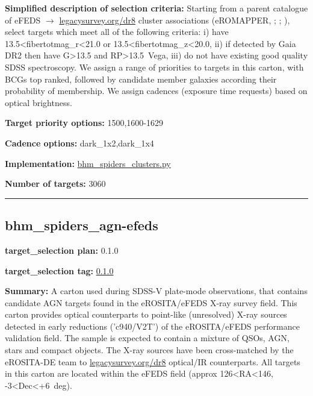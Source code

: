 \noindent\textbf{Simplified description of selection criteria:} Starting from a
parent catalogue of eFEDS $\rightarrow$
\href{https://www.legacysurvey.org/dr8}{legacysurvey.org/dr8} cluster
associations (eROMAPPER,
\citealt{Rykoff2014};
\citealt{IderChitham2020};
\citealt{Liu2022}), select targets which meet all of the following criteria:
i) have 13.5\textless fibertotmag\_r\textless21.0 or
13.5\textless fibertotmag\_z\textless20.0, ii) if detected by Gaia DR2
then have G\textgreater13.5 and RP\textgreater13.5~Vega, iii) do not
have existing good quality SDSS spectroscopy. We assign a range of
priorities to targets in this carton, with BCGs top ranked, followed by
candidate member galaxies according their probability of membership. We
assign cadences (exposure time requests) based on optical brightness.


\noindent\textbf{Target priority options:} 1500,1600-1629

\noindent\textbf{Cadence options:} dark\_1x2,dark\_1x4

\noindent\textbf{Implementation:}
\href{https://github.com/sdss/target_selection/blob/0.3.0/python/target_selection/cartons/bhm_spiders_clusters.py}{bhm\_spiders\_clusters.py}

\noindent\textbf{Number of targets:} 3060

\begin{center}\rule{0.5\linewidth}{0.5pt}\end{center}

\hypertarget{bhm_spiders_agn-efeds_plan0.1.0}{%
\subsection{bhm\_spiders\_agn-efeds}\label{bhm_spiders_agn-efeds_plan0.1.0}}

\noindent\textbf{target\_selection plan:} 0.1.0

\noindent\textbf{target\_selection tag:}
\href{https://github.com/sdss/target_selection/tree/0.1.0/}{0.1.0}

\noindent\textbf{Summary:} A carton used during SDSS-V plate-mode observations,
that contains candidate AGN targets found in the eROSITA/eFEDS X-ray
survey field. This carton provides optical counterparts to point-like
(unresolved) X-ray sources detected in early reductions ('c940/V2T') of
the eROSITA/eFEDS performance validation field. The sample is expected
to contain a mixture of QSOs, AGN, stars and compact objects. The X-ray
sources have been cross-matched by the eROSITA-DE team to
\href{https://www.legacysurvey.org/dr8/}{legacysurvey.org/dr8}
optical/IR counterparts. All targets in this carton are located within
the eFEDS field (approx 126\textless RA\textless146,
-3\textless Dec\textless+6~deg).

